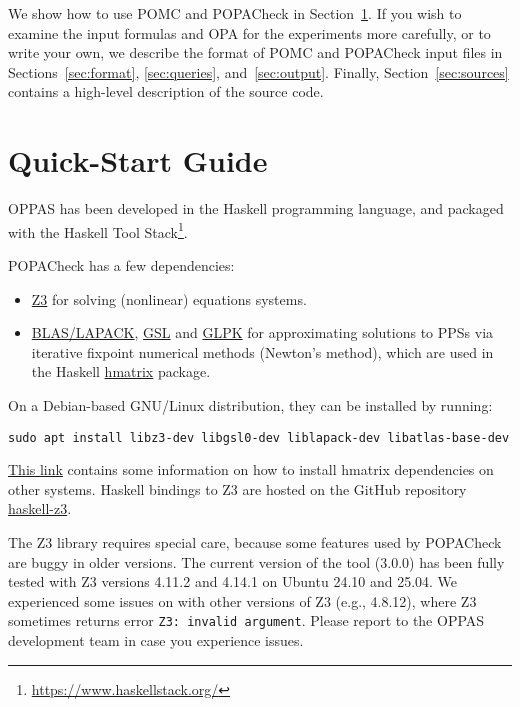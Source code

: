 \documentclass[9pt,a4paper]{article}
\begin{document}
We show how to use POMC and POPACheck in Section~\ref{sec:quick-start}.
If you wish to examine the input formulas and OPA for the experiments more carefully,
or to write your own, we describe the format of POMC and POPACheck input files in Sections~\ref{sec:format}, \ref{sec:queries}, and~\ref{sec:output}.
Finally, Section~\ref{sec:sources} contains a high-level description of the source code.


\section{Quick-Start Guide}
\label{sec:quick-start}

OPPAS has been developed in the Haskell programming language,
and packaged with the Haskell Tool Stack\footnote{\url{https://www.haskellstack.org/}}.

POPACheck has a few dependencies:
\begin{itemize}
    \item \href{https://microsoft.github.io/z3guide/z3}{Z3} for solving (nonlinear) equations systems.
    \item \href{https://www.netlib.org/lapack/}{BLAS/LAPACK}, \href{ttps://www.gnu.org/software/gsl/}{GSL} and \href{https://www.gnu.org/software/glpk/}{GLPK} for approximating solutions to PPSs via iterative fixpoint numerical methods (Newton's method), which are used in the Haskell \href{https://hackage.haskell.org/package/hmatrix}{hmatrix} package.
\end{itemize}
On a Debian-based GNU/Linux distribution, they can be installed by running:
\begin{verbatim}
sudo apt install libz3-dev libgsl0-dev liblapack-dev libatlas-base-dev
\end{verbatim}

\href{https://github.com/haskell-numerics/hmatrix/blob/master/INSTALL.md}{This link} contains some information on how to install hmatrix dependencies on other systems.
Haskell bindings to Z3 are hosted on the GitHub repository \href{https://github.com/michiari/haskell-z3}{haskell-z3}.

The Z3 library requires special care, because some features used by POPACheck are buggy in older versions.
The current version of the tool (3.0.0) has been fully tested with Z3 versions 4.11.2 and 4.14.1 on Ubuntu 24.10 and 25.04.
We experienced some issues on with other versions of Z3 (e.g., 4.8.12), where Z3 sometimes returns error \verb|Z3: invalid argument|.
Please report to the OPPAS development team in case you experience issues.
\end{document}
